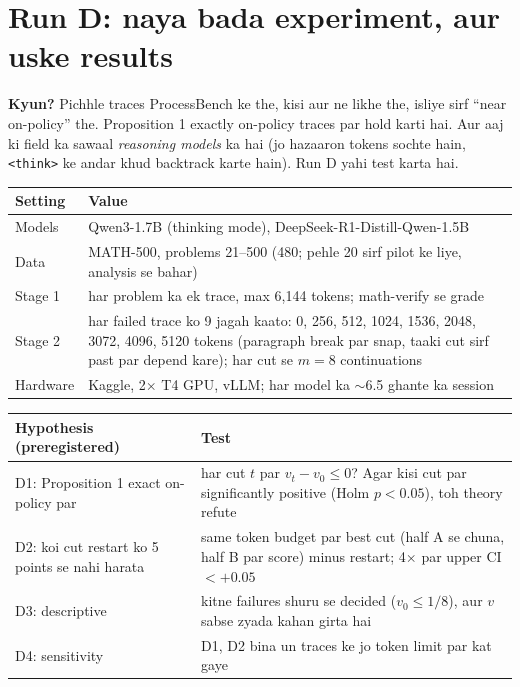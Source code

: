 \documentclass[10pt,a4paper]{article}
\begin{document}
\section{Run D: naya bada experiment, aur uske results}
\textbf{Kyun?} Pichhle traces ProcessBench ke the, kisi aur ne likhe the, isliye sirf ``near on-policy'' the.
Proposition 1 exactly on-policy traces par hold karti hai. Aur aaj ki field ka sawaal \emph{reasoning models}
ka hai (jo hazaaron tokens sochte hain, \texttt{<think>} ke andar khud backtrack karte hain). Run D yahi test karta hai.
\begin{center}\small
\begin{tabularx}{\textwidth}{lX}
\toprule
Setting & Value \\
\midrule
Models & Qwen3-1.7B (thinking mode), DeepSeek-R1-Distill-Qwen-1.5B \\
Data & MATH-500, problems 21--500 (480; pehle 20 sirf pilot ke liye, analysis se bahar) \\
Stage 1 & har problem ka ek trace, max 6,144 tokens; math-verify se grade \\
Stage 2 & har failed trace ko 9 jagah kaato: 0, 256, 512, 1024, 1536, 2048, 3072, 4096, 5120 tokens
(paragraph break par snap, taaki cut sirf past par depend kare); har cut se $m=8$ continuations \\
Hardware & Kaggle, 2$\times$ T4 GPU, vLLM; har model ka $\sim$6.5 ghante ka session \\
\bottomrule
\end{tabularx}
\end{center}
\begin{center}\small
\begin{tabularx}{\textwidth}{lX}
\toprule
Hypothesis (preregistered) & Test \\
\midrule
D1: Proposition 1 exact on-policy par & har cut $t$ par $v_t - v_0 \le 0$? Agar kisi cut par significantly positive (Holm $p<0.05$), toh theory refute \\
D2: koi cut restart ko 5 points se nahi harata & same token budget par best cut (half A se chuna, half B par score) minus restart; 4$\times$ par upper CI $< +0.05$ \\
D3: descriptive & kitne failures shuru se decided ($v_0 \le 1/8$), aur $v$ sabse zyada kahan girta hai \\
D4: sensitivity & D1, D2 bina un traces ke jo token limit par kat gaye \\
\bottomrule
\end{tabularx}
\end{center}
\end{document}
